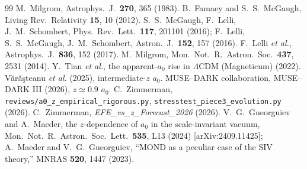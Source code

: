 \documentclass[11pt]{article}
\begin{document}
\begin{thebibliography}{99}
\small
{} M.~Milgrom, Astrophys.\ J.\ {\bf 270}, 365 (1983).
 B.~Famaey and S.~S.~McGaugh, Living Rev.\ Relativity {\bf 15}, 10 (2012).
 S.~S.~McGaugh, F.~Lelli, J.~M.~Schombert, Phys.\ Rev.\ Lett.\ {\bf 117}, 201101
  (2016); F.~Lelli, S.~S.~McGaugh, J.~M.~Schombert, Astron.\ J.\ {\bf 152}, 157 (2016).
 F.~Lelli \textit{et al.}, Astrophys.\ J.\ {\bf 836}, 152 (2017).
 M.~Milgrom, Mon.\ Not.\ R.\ Astron.\ Soc.\ {\bf 437}, 2531 (2014).
 Y.~Tian \textit{et al.}, the apparent-$a_0$ rise in $\Lambda$CDM (Magneticum) (2022).
 V\u{a}r\u{a}\c{s}teanu \textit{et al.} (2025), intermediate-$z$ $a_0$.
 MUSE--DARK collaboration, MUSE--DARK III (2026), $z\simeq0.9$ $a_0$.
 C.~Zimmerman, \texttt{reviews/a0\_z\_empirical\_rigorous.py},
  \texttt{stresstest\_piece3\_evolution.py} (2026).
 C.~Zimmerman, \textit{EFE\_vs\_z\_Forecast\_2026} (2026).
 V.~G.~Gueorguiev and A.~Maeder, the $z$-dependence of $a_0$ in the
  scale-invariant vacuum, Mon.\ Not.\ R.\ Astron.\ Soc.\ Lett.\ {\bf 535}, L13 (2024) [arXiv:2409.11425];
  A.~Maeder and V.~G.~Gueorguiev, ``MOND as a peculiar case of the SIV theory,'' MNRAS {\bf 520}, 1447 (2023).
\end{thebibliography}
\end{document}
